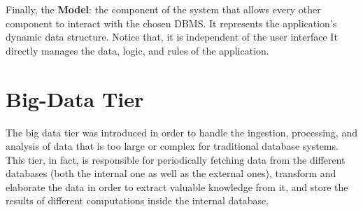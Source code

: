 \documentclass[10pt]{report}
\begin{document}
Finally, the \textbf{Model}: the component of the system that allows every other
component to interact with the chosen DBMS. It represents the
application's dynamic data structure. Notice that, it is independent of the user interface
It directly manages the data, logic, and rules of the application.




\section{Big-Data Tier}
The big data tier was introduced in order to handle the ingestion, processing, and analysis of data that is too large or complex for traditional database systems. This tier, in fact, is responsible for periodically fetching data from the different databases (both the internal one as well as the external ones), transform and elaborate the data in order to extract valuable knowledge from it, and store the results of different computations inside the internal database.
\end{document}
